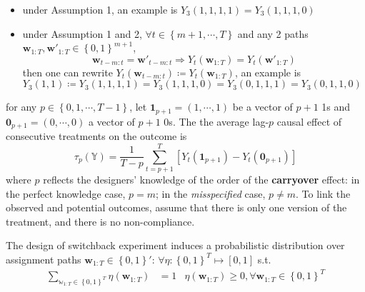 \documentclass[twoside]{article}
\begin{document}
\begin{itemize}
    \item under Assumption 1, an example is $Y_3\left(1,1,1,1\right) = Y_3 \left(1,1,1,0\right)$
    \item under Assumption 1 and 2, $\forall t\in \left\{m+1,\cdots,T\right\}$ and any 2 paths $\mathbf{w}_{1:T},\mathbf{w}'_{1:T} \in \left\{0,1\right\}^{m+1}$, $$ \mathbf{w}_{t-m:t} = \mathbf{w}'_{t-m:t} \Rightarrow Y_{t}\left(\mathbf{w}_{1:T}\right) = Y_t\left(\mathbf{w}'_{1:T}\right) $$
    then one can rewrite $Y_t\left(\mathbf{w}_{t-m:t}\right) \coloneq Y_t \left(\mathbf{w}_{1:T}\right)$, an example is $Y_3(1,1)\coloneq Y_3\left(1,1,1,1\right) = Y_3(1,1,1,0) = Y_3(0,1,1,1) = Y_3(0,1,1,0)$
\end{itemize}

for any $p\in\left\{0,1,\cdots,T-1\right\}$, let $\mathbf{1}_{p+1}=\left({1,\cdots,1}\right)$ be a vector of $p+1$ 1s and $\mathbf{0}_{p+1}=\left(0,\cdots,0\right)$ a vector of $p+1$ 0s. The the average lag-$p$ causal effect of consecutive treatments on the outcome is 
\begin{equation*}
    \tau_p\left(\mathbb{Y}\right) = \frac{1}{T-p} \sum^T_{t=p+1} \left[Y_t\left(\mathbf{1}_{p+1}\right)-Y_t\left(\mathbf{0}_{p+1}\right)\right]
\end{equation*}
where $p$ reflects the designers' knowledge of the order of the \textbf{carryover} effect:
in the perfect knowledge case, $p=m$; in the \textit{misspecified} case, $p\neq m$. To link the observed and potential outcomes, \citet{bojinov2023design} assume that there is only one version of the treatment, and there is no non-compliance.

The design of switchback experiment induces a probabilistic distribution over assignment paths $\mathbf{w}_{1:T}\in \left\{0,1\right\}'$: $\forall \eta: \left\{0,1\right\}^T \mapsto [0,1]$ s.t. 
\begin{align*}
    \sum_{\mathbb{w}_{1:T}\in\left\{0,1\right\}^T} \eta\left(\mathbf{w}_{1:T}\right) &=1 & \eta\left(\mathbf{w}_{1:T}\right)\geq 0,\forall \mathbf{w}_{1:T}\in\left\{0,1\right\}^T
\end{align*}
\end{document}
